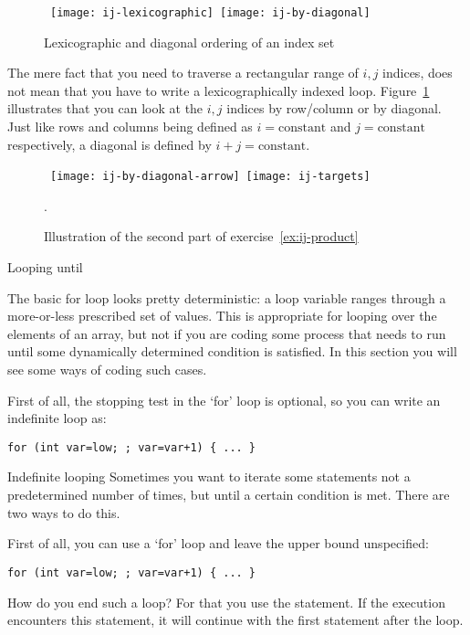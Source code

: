 \begin{figure}[ht]
  \hbox{%
    \texttt{[image: ij-lexicographic]}
    \texttt{[image: ij-by-diagonal]}
    }
  \caption{Lexicographic and diagonal ordering of an index set}  
  \label{fig:ij-lex}
\end{figure}

The mere fact that you need to traverse a rectangular range
of $i,j$ indices,
does not mean that you have to write a lexicographically
indexed loop.
Figure~\ref{fig:ij-lex} illustrates that you can look at the $i,j$
indices by row/column or by diagonal. Just like rows and columns being
defined as $i=\mathrm{constant}$ and $j=\mathrm{constant}$
respectively,
a diagonal is defined by $i+j=\mathrm{constant}$.

\begin{figure}[ht]
  \hbox{%
    \texttt{[image: ij-by-diagonal-arrow]}
    \texttt{[image: ij-targets]}
    }
  \caption{Illustration of the second part of exercise~\ref{ex:ij-product}}.
  \label{fig:ij-min}
\end{figure}

 {Looping until}
\label{sec:loopuntil}

The basic for loop looks pretty deterministic: a loop variable ranges
through a more-or-less prescribed set of values. This is appropriate
for looping over the elements of an array, but not if you are coding
some process that needs to run until some dynamically determined
condition is satisfied. In this section you will see some ways of
coding such cases.

First of all, the stopping test in the `for' loop is optional, so you
can write an indefinite loop as:
\begin{lstlisting}
for (int var=low; ; var=var+1) { ... }
\end{lstlisting}

\begin{slide}{Indefinite looping}
  \label{sl:for-inf}
  Sometimes you want to iterate some statements not a predetermined
  number of times, but until a certain condition is met. There are two
  ways to do this.

  First of all, you can use a `for' loop and leave the upper bound
  unspecified:
\begin{lstlisting}
for (int var=low; ; var=var+1) { ... }
\end{lstlisting}
\end{slide}

How do you end such a loop? For that you use the
 statement. If the execution encounters this
statement, it will continue with the first statement after the loop.


